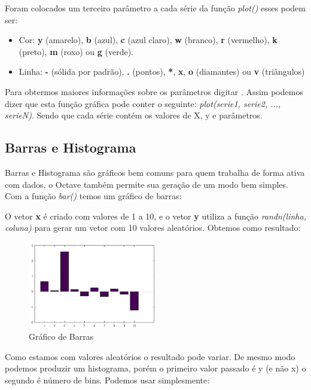 \documentclass[a4paper,11pt]{article}
\begin{document}
Foram colocados um terceiro parâmetro a cada série da função \textit{plot()} esses podem ser: \vspace{-1em}
\begin{itemize}[nolistsep]
	\item Cor: \textbf{y} (amarelo), \textbf{b} (azul), \textbf{c} (azul claro), \textbf{w} (branco), \textbf{r} (vermelho), \textbf{k} (preto), \textbf{m} (roxo) ou \textbf{g} (verde).
	\item Linha: \textbf{-} (sólida por padrão), \textbf{.} (pontos), \textbf{*}, \textbf{x}, \textbf{o} (diamantes) ou \textbf{v} (triângulos)
\end{itemize}

Para obtermos maiores informações sobre os parâmetros digitar . Assim podemos dizer que esta função gráfica pode conter o seguinte: \textit{plot(serie1, serie2, ..., serieN)}. Sendo que cada série contém os valores de X, y e parâmetros.

\subsection{Barras e Histograma}
Barras e Histograma são gráficos bem comuns para quem trabalha de forma ativa com dados, o Octave também permite sua geração de um modo bem simples. Com a função \textit{bar()} temos um gráfico de barras: \\

O vetor \textbf{x} é criado com valores de 1 a 10, e o vetor \textbf{y} utiliza a função \textit{randn(linha, coluna)} para gerar um vetor com 10 valores aleatórios. Obtemos como resultado:
\begin{figure}[H]
	\centering
	\includegraphics[width=0.5\textwidth]{imagem/barras}
	\caption{Gráfico de Barras}
\end{figure}

Como estamos com valores aleatórios o resultado pode variar. De mesmo modo podemos produzir um histograma, porém o primeiro valor passado é y (e não x) o segundo é número de bins. Podemos usar simplesmente: \\
\end{document}
